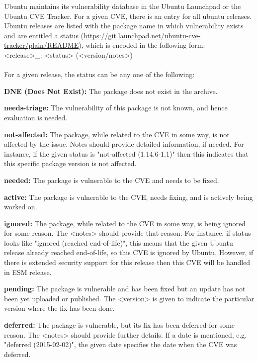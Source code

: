 \documentclass[a4paper,num-refs]{oup-contemporary}
\begin{document}
Ubuntu maintains its vulnerability database in the Ubuntu Launchpad or the Ubuntu CVE Tracker. For a given CVE, there is an entry for all ubuntu releases.
Ubuntu releases are listed with the package name
in which vulnerability exists and are entitled a status
(\href{https://git.launchpad.net/ubuntu-cve-tracker/plain/README}{https://git.launchpad.net/ubuntu-cve-tracker/plain/README}), which is
encoded in the following form:
\newline \\
\noindent <release>\_<source-package>: <status> (<version/notes>) \\
\newline\\
For a given release, the status can be any one of the following:

\textbf{DNE (Does Not Exist):} The package does not exist in the
		archive.

\textbf{needs-triage:} The vulnerability of this package
		is not known, and hence evaluation is needed.

\textbf{not-affected:} The package, while related to the
		CVE in some way, is not affected by the issue. Notes should
		provide detailed information, if needed. For instance, if the given
		status is "not-affected (1.14.6-1.1)" then this indicates that this specific
		package version is not affected.

\textbf{needed:} The package is vulnerable to the
		CVE and needs to be fixed.

\textbf{active:} The package is vulnerable to the
		CVE, needs fixing, and is actively being worked on.

\textbf{ignored:} The package, while related to the
		CVE in some way, is being ignored for some reason. The
		<notes> should provide that reason. For instance, if status looks like
		"ignored (reached end-of-life)", this means that the given Ubuntu release already reached
		end-of-life, so this CVE is ignored by Ubuntu. However, if there
		is extended security support for this release then this
		CVE will be handled in ESM release.

\textbf{pending:} The package is vulnerable and
                  has been fixed but an update has not been yet uploaded or
		  published. The <version> is given to indicate the particular 
		  version where the fix has been done.

\textbf{deferred:} The package is vulnerable, but 
                   its fix has been deferred for some reason. The <notes>
		   should provide further details. If a date is mentioned, e.g.
		   "deferred (2015-02-02)", the given date specifies the date when
		   the CVE was deferred.
\end{document}
